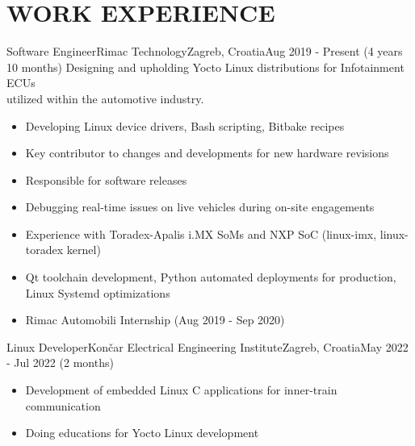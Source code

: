 \documentclass[10pt, a4paper]{article}
\begin{document}
\section{WORK EXPERIENCE}


\begin{cvitem}{Software Engineer}{Rimac Technology}{Zagreb, Croatia}{Aug 2019 - Present (4 years 10 months)}
Designing and upholding Yocto Linux distributions for Infotainment ECUs\\utilized within the automotive industry.
    \begin{itemize}
        \item Developing Linux device drivers, Bash scripting, Bitbake recipes
        \item Key contributor to changes and developments for new hardware revisions
        \item Responsible for software releases
        \item Debugging real-time issues on live vehicles during on-site engagements
        \item Experience with Toradex-Apalis i.MX SoMs and NXP SoC (linux-imx, linux-toradex kernel)
        \item Qt toolchain development, Python automated deployments for production, Linux Systemd optimizations
        \item Rimac Automobili Internship (Aug 2019 - Sep 2020)
    \end{itemize}
\end{cvitem}


\begin{cvitem}{Linux Developer}{Končar Electrical Engineering Institute}{Zagreb, Croatia}{May 2022 - Jul 2022 (2 months)}
    \begin{itemize}
        \item Development of embedded Linux C applications for inner-train communication
        \item Doing educations for Yocto Linux development
    \end{itemize}
\end{cvitem}
\end{document}
